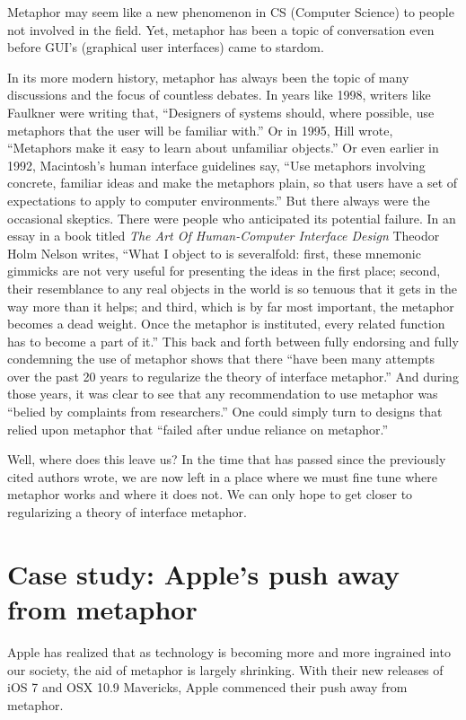 \documentclass[11pt, oneside]{article}
\begin{document}
Metaphor may seem like a new phenomenon in CS (Computer Science) to people not involved in the field. Yet, metaphor has been a topic of conversation even before GUI's (graphical user interfaces) came to stardom.

In its more modern history, metaphor has always been the topic of many discussions and the focus of countless debates. In years like 1998, writers like Faulkner were writing that, ``Designers of systems should, where possible, use metaphors that the user will be familiar with.'' \cite{essence}  Or in 1995, Hill wrote, ``Metaphors make it easy to learn about unfamiliar objects.'' \cite{practical} Or even earlier in 1992, Macintosh's human interface guidelines say, ``Use metaphors involving concrete, familiar ideas and make the metaphors plain, so that users have a set of expectations to apply to computer environments.'' \cite{apple} But there always were the occasional skeptics. There were people who anticipated its potential failure. In an essay in a book titled \textit{The Art Of Human-Computer Interface Design} Theodor Holm Nelson writes, ``What I object to is severalfold: first, these mnemonic gimmicks are not very useful for presenting the ideas in the first place; second, their resemblance to any real objects in the world is so tenuous that it gets in the way more than it helps; and third, which is by far most important, the metaphor becomes a dead weight. Once the metaphor is instituted, every related function has to become a part of it.''\cite{art-hci} This back and forth between fully endorsing and fully condemning the use of metaphor shows that there ``have been many attempts over the past 20 years to regularize the theory of interface metaphor.'' And during those years, it was clear to see that any recommendation to use metaphor was ``belied by complaints from researchers.'' One could simply turn to designs that relied upon metaphor that ``failed after undue reliance on metaphor.'' \cite{reification}

Well, where does this leave us? In the time that has passed since the previously cited authors wrote, we are now left in a place where we must fine tune where metaphor works and where it does not. We can only hope to get closer to regularizing a theory of interface metaphor.

\section{Case study: Apple's push away from metaphor}
Apple has realized that as technology is becoming more and more ingrained into our society, the aid of metaphor is largely shrinking. With their new releases of iOS 7 and OSX 10.9 Mavericks, Apple commenced their push away from metaphor.
\end{document}
